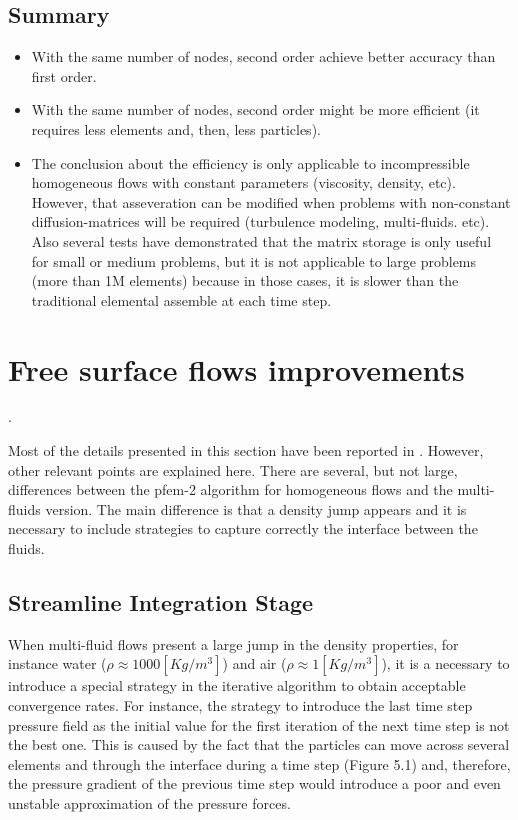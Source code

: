 \documentclass[a4paper,conference]{IEEEtran}
\begin{document}
\newpage

\subsection{Summary}

  \begin{itemize}
   \item With the same number of nodes, second order achieve better accuracy than first order. 
   \item With the same number of nodes, second order might be more efficient (it requires less elements and, then, less particles).
   \item The conclusion about the efficiency is only applicable to incompressible homogeneous flows with constant parameters (viscosity, density, etc). However, that asseveration can be modified when problems with non-constant diffusion-matrices will be required (turbulence modeling, multi-fluids. etc). Also several tests have demonstrated that the matrix storage is only useful for small or medium problems, but it is not applicable to large problems (more than 1M elements) because in those cases, it is slower than the traditional elemental assemble at each time step.
  \end{itemize}
  
\section{Free surface flows improvements}. 

Most of the details presented in this section have been reported in \cite{Idelsohn13c}. However, other relevant points are explained here. There are several, but not large, differences between the pfem-2 algorithm for homogeneous flows and the multi-fluids version. The main difference is that a density jump appears and it is necessary to include strategies to capture correctly the interface between the fluids.
	
	\subsection{Streamline Integration Stage}

    When multi-fluid flows present a large jump in the density properties, for instance water ($\rho \approx 1000 [Kg/m^3]$) and air ($\rho \approx 1 [Kg/m^3]$), it is a necessary to introduce a special strategy in the iterative algorithm to obtain acceptable convergence rates. For instance, the strategy to introduce the last time step pressure field as the initial value for the first iteration of the next time step is not the best one. This is caused by the fact that the particles can move across several elements and through the interface during a time step (Figure 5.1) and, therefore, the pressure gradient of the previous time step would introduce a poor and even unstable approximation of the pressure forces.
       
\end{document}

